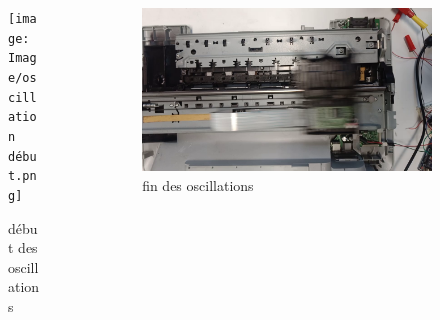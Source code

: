 \documentclass{beamer}
\begin{document}
		\begin{frame}
			\begin{columns}
				\begin{column}{0.5\textwidth} 
				\begin{figure}
					\texttt{[image: Image/oscillation début.png]}
					\caption{début des oscillations}
				\end{figure}
				
				
			\end{column}
			\begin{column}{0.5\textwidth} 
				\begin{figure}
					\includegraphics[width=\textwidth]{Image/oscillation fin.png}
					\caption{fin des oscillations}
				\end{figure}
				
			\end{column}
		\end{columns}
	\end{frame}
\end{document}
